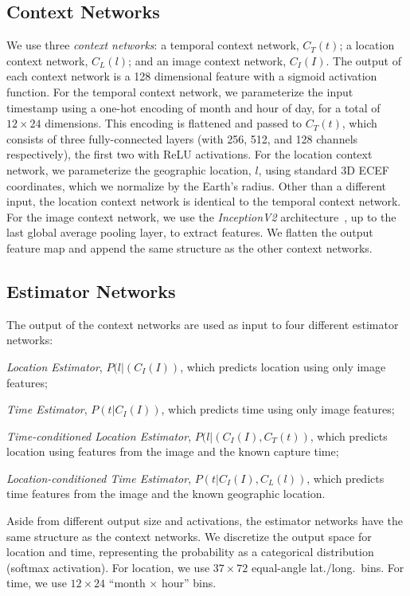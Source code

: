 \subsection{Context Networks}

We use three {\em context networks}: a temporal context network,
$C_T(t)$; a location context network, $C_L(l)$; and an image context
network, $C_I(I)$. The output of each context network is a 128
dimensional feature with a sigmoid activation function. 
%
For the temporal context network, we parameterize the input timestamp
using a one-hot encoding of month and hour of day, for a total of $12
\times 24$ dimensions.  This encoding is flattened and passed to
$C_T(t)$, which consists of three fully-connected layers (with 256,
512, and 128 channels respectively), the first two with ReLU
activations. 
%
For the location context network, we parameterize the geographic
location, $l$, using standard 3D ECEF coordinates, which we normalize
by the Earth's radius. Other than a different input, the location
context network is identical to the temporal context network. 
%
For the image context network, we use the {\em InceptionV2}
architecture~\cite{szegedy2016rethinking}, up to the last global
average pooling layer, to extract features. We flatten the output
feature map and append the same structure as the other context
networks. 

\subsection{Estimator Networks}

The output of the context networks are used as input to four different
estimator networks:
\begin{compactitem}
  
  \item {\em Location Estimator}, $P(l|(C_I(I))$, which predicts
    location using only image features;

  \item {\em Time Estimator}, $P(t|C_I(I))$, which predicts time using
    only image features; 

  \item {\em Time-conditioned Location Estimator}, $P(l|(C_I(I),C_T(t))$, which predicts
    location using features from the image and the known capture time;

  \item {\em Location-conditioned Time Estimator}, $P(t|C_I(I),C_L(l))$, which
    predicts time features from the image and the known geographic
    location. 

\end{compactitem}
%
Aside from different output size and activations, the estimator
networks have the same structure as the context networks. We
discretize the output space for location and time, representing the
probability as a categorical distribution (softmax activation). For
location, we use $37 \times 72$ equal-angle lat./long.\ bins.  For
time, we use $12 \times 24$ ``month $\times$ hour'' bins.

